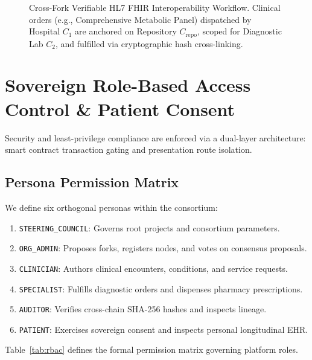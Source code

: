 \documentclass[journal]{IEEEtran}
\theoremstyle{definition}
\begin{document}
\begin{figure}[t]
\centering

\caption{Cross-Fork Verifiable HL7 FHIR Interoperability Workflow. Clinical orders (e.g., Comprehensive Metabolic Panel) dispatched by Hospital $C_1$ are anchored on Repository $C_{\text{repo}}$, scoped for Diagnostic Lab $C_2$, and fulfilled via cryptographic hash cross-linking.}
\label{fig:fhir}
\end{figure}

\section{Sovereign Role-Based Access Control \& Patient Consent}
Security and least-privilege compliance are enforced via a dual-layer architecture: smart contract transaction gating and presentation route isolation.

\subsection{Persona Permission Matrix}
We define six orthogonal personas within the consortium:
\begin{enumerate}
    \item \texttt{STEERING\_COUNCIL}: Governs root projects and consortium parameters.
    \item \texttt{ORG\_ADMIN}: Proposes forks, registers nodes, and votes on consensus proposals.
    \item \texttt{CLINICIAN}: Authors clinical encounters, conditions, and service requests.
    \item \texttt{SPECIALIST}: Fulfills diagnostic orders and dispenses pharmacy prescriptions.
    \item \texttt{AUDITOR}: Verifies cross-chain SHA-256 hashes and inspects lineage.
    \item \texttt{PATIENT}: Exercises sovereign consent and inspects personal longitudinal EHR.
\end{enumerate}

Table~\ref{tab:rbac} defines the formal permission matrix governing platform roles.
\end{document}
